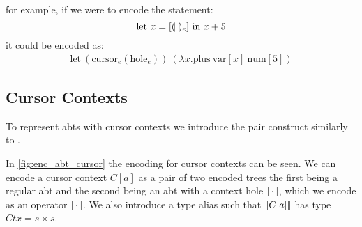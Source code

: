 \documentclass[sigplan,screen]{acmart}
\begin{document}
for example, if we were to encode the statement:
\begin{equation*}
        \text{let $x=[\llparenthesis \ \rrparenthesis_e]$ in $x+5$}
    \end{equation*}
    it could be encoded as:
    \begin{align*} 
        \text{let} \ (\text{cursor}_e(\text{hole}_e)) \ (\lambda x . \text{plus} \ \text{var}[x] \ \text{num}[5])
  \end{align*}




\subsection{Cursor Contexts}\label{sec:enc_cursor_contexts}

To represent abts with cursor contexts we introduce the pair construct similarly to \cite{types_programming_languages}.


In \cref{fig:enc_abt_cursor} the encoding for cursor contexts can be seen. We can encode a cursor context $C[a]$ as a pair of two encoded trees the first being a regular abt and the second being an abt with a context hole $[ \, \cdot \, ]$, which we encode as an operator $[ \, \cdot \, ]$. We also introduce a type alias such that $\llbracket C[a] \rrbracket$ has type $Ctx = s \times s$.
\end{document}
